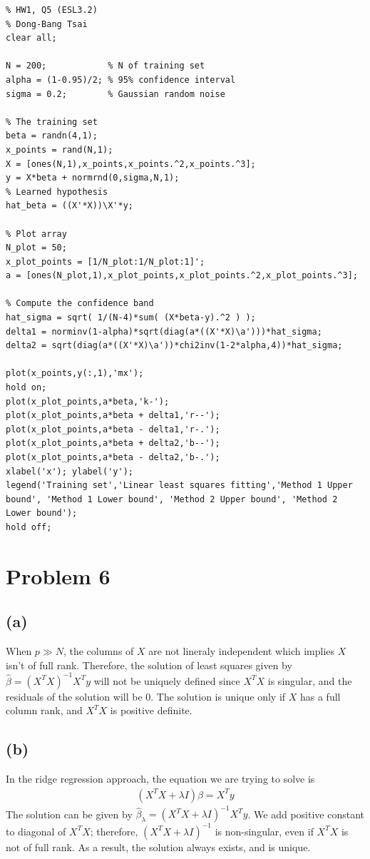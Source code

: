 \documentclass[pra,groupedaddress,amsmath,amssymb, column]{revtex4}
\begin{document}
\begin{verbatim}
% HW1, Q5 (ESL3.2)
% Dong-Bang Tsai
clear all;

N = 200;            % N of training set
alpha = (1-0.95)/2; % 95% confidence interval
sigma = 0.2;        % Gaussian random noise

% The training set
beta = randn(4,1);
x_points = rand(N,1); 
X = [ones(N,1),x_points,x_points.^2,x_points.^3]; 
y = X*beta + normrnd(0,sigma,N,1);
% Learned hypothesis
hat_beta = ((X'*X))\X'*y; 

% Plot array
N_plot = 50;
x_plot_points = [1/N_plot:1/N_plot:1]';
a = [ones(N_plot,1),x_plot_points,x_plot_points.^2,x_plot_points.^3];

% Compute the confidence band
hat_sigma = sqrt( 1/(N-4)*sum( (X*beta-y).^2 ) );
delta1 = norminv(1-alpha)*sqrt(diag(a*((X'*X)\a')))*hat_sigma;
delta2 = sqrt(diag(a*((X'*X)\a'))*chi2inv(1-2*alpha,4))*hat_sigma;

plot(x_points,y(:,1),'mx'); 
hold on;
plot(x_plot_points,a*beta,'k-');
plot(x_plot_points,a*beta + delta1,'r--'); 
plot(x_plot_points,a*beta - delta1,'r-.');
plot(x_plot_points,a*beta + delta2,'b--'); 
plot(x_plot_points,a*beta - delta2,'b-.');
xlabel('x'); ylabel('y');
legend('Training set','Linear least squares fitting','Method 1 Upper bound', 'Method 1 Lower bound', 'Method 2 Upper bound', 'Method 2 Lower bound');
hold off;
\end{verbatim}


\section*{Problem 6}
\subsection*{(a)}
When $p \gg N$, the columns of $X$ are not lineraly independent which implies $X$ isn't of full rank. Therefore, the solution of least squares given by $\hat{\beta}=(X^TX )^{-1}X^T y$ will not be uniquely defined since $X^TX$ is singular, and the residuals of the solution will be $0$. The solution is unique only if $X$ has a full column rank, and $X^TX$ is positive definite. 


\subsection*{(b)}
In the ridge regression approach, the equation we are trying to solve is 
\begin{align}
(X^TX +  \lambda I)\beta = X^T y
\end{align}
The solution can be given by $\hat{\beta}_{\lambda}=(X^TX +  \lambda I)^{-1}X^T y$.  We add positive constant to diagonal of $X^TX$; therefore, $(X^TX +  \lambda I)^{-1}$ is non-singular, even if $X^TX$ is not of full rank. As a result, the solution always exists, and is unique.
\end{document}
